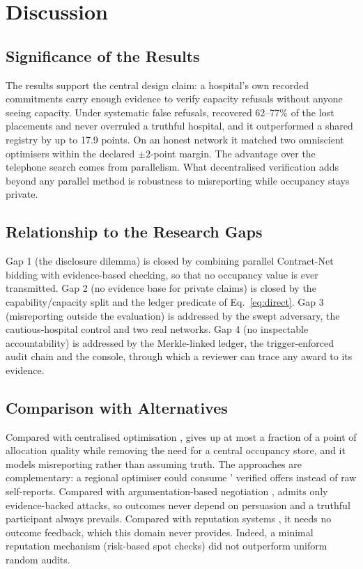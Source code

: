 \section{Discussion}
\label{sec:discussion}

\subsection{Significance of the Results}
The results support the central design claim: a hospital's own recorded commitments carry enough evidence to verify capacity refusals without anyone seeing capacity. Under systematic false refusals, \mahros{} recovered 62--77\% of the lost placements and never overruled a truthful hospital, and it outperformed a shared registry by up to 17.9 points. On an honest network it matched two omniscient optimisers within the declared $\pm2$-point margin. The advantage over the telephone search comes from parallelism. What decentralised verification adds beyond any parallel method is robustness to misreporting while occupancy stays private.

\subsection{Relationship to the Research Gaps}
Gap 1 (the disclosure dilemma) is closed by combining parallel Contract-Net bidding with evidence-based checking, so that no occupancy value is ever transmitted. Gap 2 (no evidence base for private claims) is closed by the capability/capacity split and the ledger predicate of Eq.~\eqref{eq:direct}. Gap 3 (misreporting outside the evaluation) is addressed by the swept adversary, the cautious-hospital control and two real networks. Gap 4 (no inspectable accountability) is addressed by the Merkle-linked ledger, the trigger-enforced audit chain and the console, through which a reviewer can trace any award to its evidence.

\subsection{Comparison with Alternatives}
Compared with centralised optimisation \cite{dijkstra2023balancing,parker2020redistribution,mehrotra2020ventilator}, \mahros{} gives up at most a fraction of a point of allocation quality while removing the need for a central occupancy store, and it models misreporting rather than assuming truth. The approaches are complementary: a regional optimiser could consume \mahros{}' verified offers instead of raw self-reports. Compared with argumentation-based negotiation \cite{rahwan2003abn,amgoud2007unified}, \mahros{} admits only evidence-backed attacks, so outcomes never depend on persuasion and a truthful participant always prevails. Compared with reputation systems \cite{ramchurn2004trust,sabater2005trust}, it needs no outcome feedback, which this domain never provides. Indeed, a minimal reputation mechanism (risk-based spot checks) did not outperform uniform random audits.

